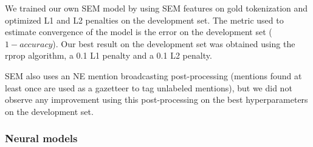 We trained our own SEM model by using SEM features on gold tokenization and optimized L1 and L2 penalties on the development set. The metric used to estimate convergence of the model is the error on the development set ($1 - accuracy$). Our best result on the development set was obtained using the rprop algorithm, a 0.1 L1 penalty and a 0.1 L2 penalty.

SEM also uses an NE mention broadcasting post-processing (mentions found at least once are used as a gazetteer to tag unlabeled mentions), but we did not observe any improvement using this post-processing on the best hyperparameters on the development set.


\subsubsection{Neural models}

